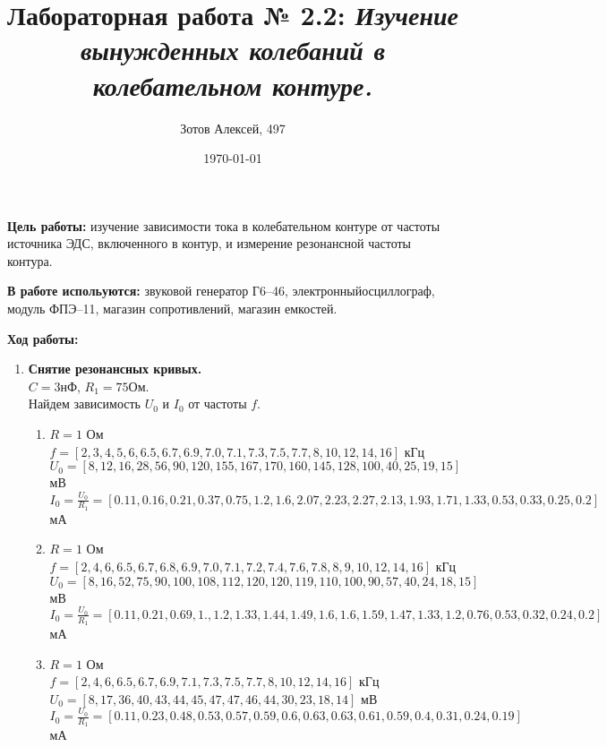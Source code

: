 \documentclass[10pt]{article}
\title{Лабораторная работа № 2.2: {\it Изучение вынужденных колебаний в колебательном контуре.}}
\author{Зотов Алексей, 497}
\date{\today}
\begin{document}
\maketitle
\textbf{Цель работы:} изучение зависимости тока в колебательном контуре от частоты источника ЭДС, включенного в контур, и измерение резонансной частоты контура.

\textbf{В работе испольуются:} \small{звуковой генератор Г6–46, электронныйосциллограф, модуль ФПЭ–11, магазин сопротивлений, магазин емкостей.}

\textbf{Ход работы:}
    \begin{enumerate}
    \item \textbf{Снятие резонансных кривых.} \\
        $C = 3$нФ, $R_1 = 75$Ом. \\
        Найдем зависимость $U_0$ и $I_0$ от частоты $f$. 
        \small{
        \begin{enumerate}
            \item $R = 1$ Ом \\
            $f = [2,3,4,5,6,6.5,6.7,6.9,7.0,7.1,7.3,7.5,7.7,8,10,12,14,16]$ кГц \\
            $U_0 = [8,12,16,28,56,90,120,155,167,170,160,145,128,100,40,25,19,15]$ мВ \\
            $I_0 = \frac{U_0}{R_1} = [ 0.11,  0.16,  0.21,  0.37,  0.75,  1.2 ,  1.6 ,  2.07,  2.23,
         2.27,  2.13,  1.93,  1.71,  1.33,  0.53,  0.33,  0.25,  0.2 ]$ мА \\

            \item $R = 1$ Ом \\
            $f = [2,4,6,6.5,6.7,6.8,6.9,7.0,7.1,7.2,7.4,7.6,7.8,8,9,10,12,14,16]$ кГц \\
            $U_0 = [8,16,52,75,90,100,108,112,120,120,119,110,100,90,57,40,24,18,15]$ мВ \\
            $I_0 = \frac{U_0}{R_1} = [ 0.11,  0.21,  0.69,  1.  ,  1.2 ,  1.33,  1.44,  1.49,  1.6 ,
         1.6 ,  1.59,  1.47,  1.33,  1.2 ,  0.76,  0.53,  0.32,  0.24,  0.2 ]$ мА \\

         \item $R = 1$ Ом \\
            $f = [2,4,6,6.5,6.7,6.9,7.1,7.3,7.5,7.7,8,10,12,14,16]$ кГц \\
            $U_0 = [8,17,36,40,43,44,45,47,47,46,44,30,23,18,14]$ мВ \\
            $I_0 = \frac{U_0}{R_1} = [ 0.11,  0.23,  0.48,  0.53,  0.57,  0.59,  0.6 ,  0.63,  0.63,
         0.61,  0.59,  0.4 ,  0.31,  0.24,  0.19]$ мА \\
        \end{enumerate}
        }


\end{enumerate}
\end{document}
